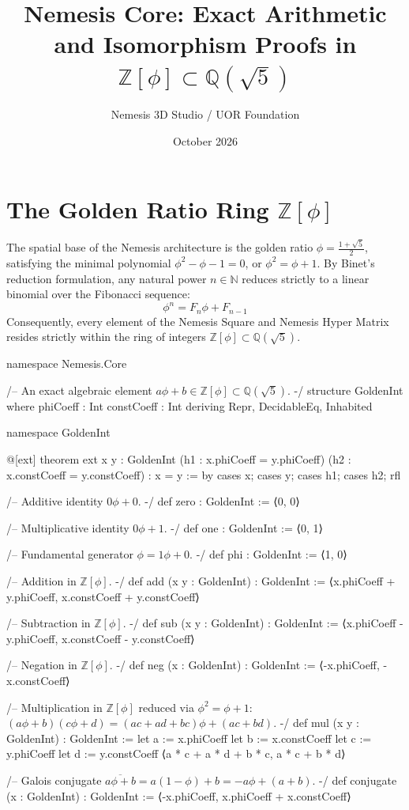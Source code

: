 \documentclass{article}
\title{Nemesis Core: Exact Arithmetic and Isomorphism Proofs in $\mathbb{Z}[\phi] \subset \mathbb{Q}(\sqrt{5})$}
\author{Nemesis 3D Studio / UOR Foundation}
\date{October 2026}
\begin{document}
\section{The Golden Ratio Ring $\mathbb{Z}[\phi]$}
The spatial base of the Nemesis architecture is the golden ratio $\phi = \frac{1+\sqrt{5}}{2}$, satisfying the minimal polynomial $\phi^2 - \phi - 1 = 0$, or $\phi^2 = \phi + 1$. By Binet's reduction formulation, any natural power $n \in \mathbb{N}$ reduces strictly to a linear binomial over the Fibonacci sequence:
$$\phi^n = F_n \phi + F_{n-1}$$
Consequently, every element of the Nemesis Square and Nemesis Hyper Matrix resides strictly within the ring of integers $\mathbb{Z}[\phi] \subset \mathbb{Q}(\sqrt{5})$.

\begin{lean}
namespace Nemesis.Core

/-- An exact algebraic element $a\phi + b \in \mathbb{Z}[\phi] \subset \mathbb{Q}(\sqrt{5})$. -/
structure GoldenInt where
  phiCoeff : Int
  constCoeff : Int
  deriving Repr, DecidableEq, Inhabited

namespace GoldenInt

@[ext]
theorem ext {x y : GoldenInt} (h1 : x.phiCoeff = y.phiCoeff) (h2 : x.constCoeff = y.constCoeff) : x = y := by
  cases x; cases y; cases h1; cases h2; rfl

/-- Additive identity $0\phi + 0$. -/
def zero : GoldenInt := ⟨0, 0⟩

/-- Multiplicative identity $0\phi + 1$. -/
def one : GoldenInt := ⟨0, 1⟩

/-- Fundamental generator $\phi = 1\phi + 0$. -/
def phi : GoldenInt := ⟨1, 0⟩

/-- Addition in $\mathbb{Z}[\phi]$. -/
def add (x y : GoldenInt) : GoldenInt :=
  ⟨x.phiCoeff + y.phiCoeff, x.constCoeff + y.constCoeff⟩

/-- Subtraction in $\mathbb{Z}[\phi]$. -/
def sub (x y : GoldenInt) : GoldenInt :=
  ⟨x.phiCoeff - y.phiCoeff, x.constCoeff - y.constCoeff⟩

/-- Negation in $\mathbb{Z}[\phi]$. -/
def neg (x : GoldenInt) : GoldenInt :=
  ⟨-x.phiCoeff, -x.constCoeff⟩

/-- Multiplication in $\mathbb{Z}[\phi]$ reduced via $\phi^2 = \phi + 1$:
    $(a\phi + b)(c\phi + d) = (ac + ad + bc)\phi + (ac + bd)$. -/
def mul (x y : GoldenInt) : GoldenInt :=
  let a := x.phiCoeff
  let b := x.constCoeff
  let c := y.phiCoeff
  let d := y.constCoeff
  ⟨a * c + a * d + b * c, a * c + b * d⟩

/-- Galois conjugate $\overline{a\phi + b} = a(1 - \phi) + b = -a\phi + (a + b)$. -/
def conjugate (x : GoldenInt) : GoldenInt :=
  ⟨-x.phiCoeff, x.phiCoeff + x.constCoeff⟩


\end{lean}
\end{document}
